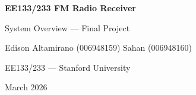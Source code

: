 \documentclass[aspectratio=169]{beamer}
\begin{document}
\begin{frame}
\begin{center}
  {\Large\bfseries\color{red} EE133/233 FM Radio Receiver}

  \vspace{0.3cm}
  {\large\color{red} System Overview --- Final Project}

  \vspace{1.2cm}
  {\large Edison Altamirano (006948159) \quad Sahan (006948160)}

  \vspace{0.6cm}
  {\small EE133/233 --- Stanford University}

  \vspace{0.6cm}
  {\large March 2026}
\end{center}
\end{frame}
\end{document}
